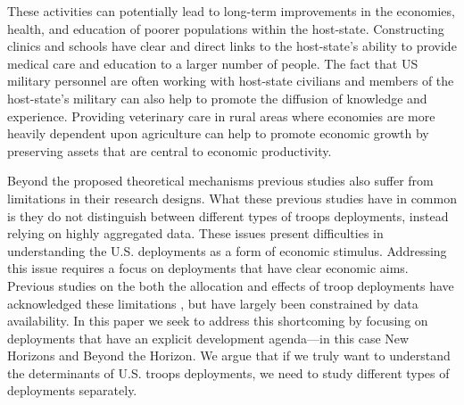 \documentclass[12pt]{article}
\begin{document}
\begin{doublespace}

These activities can potentially lead to long-term improvements in the economies, health, and education of poorer populations within the host-state.  Constructing clinics and schools have clear and direct links to the host-state's ability to provide medical care and education to a larger number of people. The fact that US military personnel are often working with host-state civilians and members of the host-state's military can also help to promote the diffusion of knowledge and experience. Providing veterinary care in rural areas where economies are more heavily dependent upon agriculture can help to promote economic growth by preserving assets that are central to economic productivity. 

Beyond the proposed theoretical mechanisms previous studies also suffer from limitations in their research designs. What these previous studies have in common is they do not distinguish between different types of troops deployments, instead relying on highly aggregated data. These issues present difficulties in understanding the U.S. deployments as a form of economic stimulus. Addressing this issue requires a focus on deployments that have clear economic aims. Previous studies on the both the allocation and effects of troop deployments have acknowledged these limitations , but have largely been constrained by data availability.  In this paper we seek to address this shortcoming by focusing on deployments that have an explicit development agenda---in this case New Horizons and Beyond the Horizon. We argue that if we truly want to understand the determinants of U.S. troops deployments, we need to study different types of deployments separately.  



\end{doublespace}
\end{document}

